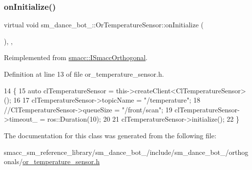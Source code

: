 \subsubsection{\texorpdfstring{on\+Initialize()}{onInitialize()}}
{\footnotesize\ttfamily virtual void sm\+\_\+dance\+\_\+bot\+\_\+::\+Or\+Temperature\+Sensor\+::on\+Initialize (\begin{DoxyParamCaption}{ }\end{DoxyParamCaption})\hspace{0.3cm}{\ttfamily [inline]}, {\ttfamily [override]}, {\ttfamily [virtual]}}



Reimplemented from \hyperlink{classsmacc_1_1ISmaccOrthogonal_a6bb31c620cb64dd7b8417f8705c79c7a}{smacc\+::\+I\+Smacc\+Orthogonal}.



Definition at line 13 of file or\+\_\+temperature\+\_\+sensor.\+h.


\begin{DoxyCode}
14     \{
15         \textcolor{keyword}{auto} clTemperatureSensor = this->createClient<ClTemperatureSensor>();
16 
17         clTemperatureSensor->topicName = \textcolor{stringliteral}{"/temperature"};
18         \textcolor{comment}{//ClTemperatureSensor->queueSize = "/front/scan";}
19         clTemperatureSensor->timeout\_ = ros::Duration(10);
20 
21         clTemperatureSensor->initialize();
22     \}
\end{DoxyCode}


The documentation for this class was generated from the following file\+:\begin{DoxyCompactItemize}
\item 
smacc\+\_\+sm\+\_\+reference\+\_\+library/sm\+\_\+dance\+\_\+bot\+\_/include/sm\+\_\+dance\+\_\+bot\+\_/orthogonals/\hyperlink{sm__dance__bot__2_2include_2sm__dance__bot__2_2orthogonals_2or__temperature__sensor_8h}{or\+\_\+temperature\+\_\+sensor.\+h}\end{DoxyCompactItemize}

